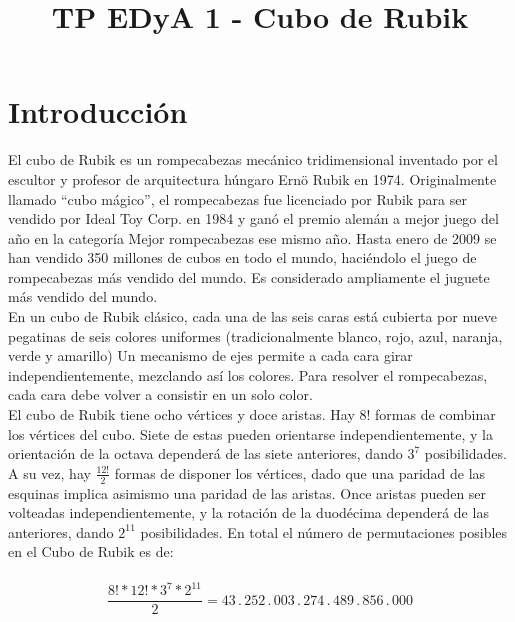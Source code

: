 \documentclass[11pt,a4paper]{article}
\begin{document}
\title{TP EDyA 1 - Cubo de Rubik}

\maketitle


\section{Introducción}

El cubo de Rubik es un rompecabezas mecánico tridimensional inventado por el escultor y profesor de arquitectura húngaro Ernö Rubik en 1974. Originalmente llamado ``cubo mágico'', el rompecabezas fue licenciado por Rubik para ser vendido por Ideal Toy Corp. en 1984 y ganó el premio alemán a mejor juego del año en la categoría Mejor rompecabezas ese mismo año. Hasta enero de 2009 se han vendido 350 millones de cubos en todo el mundo, haciéndolo el juego de rompecabezas más vendido del mundo. Es considerado ampliamente el juguete más vendido del mundo. \\

En un cubo de Rubik clásico, cada una de las seis caras está cubierta por nueve pegatinas de seis colores uniformes (tradicionalmente blanco, rojo, azul, naranja, verde y amarillo) Un mecanismo de ejes permite a cada cara girar independientemente, mezclando así los colores. Para resolver el rompecabezas, cada cara debe volver a consistir en un solo color.\\

El cubo de Rubik tiene ocho vértices y doce aristas. Hay $8!$ formas de combinar los vértices del cubo. Siete de estas pueden orientarse independientemente, y la orientación de la octava dependerá de las siete anteriores, dando  $3^7$ posibilidades. A su vez, hay $\frac{12!}{2}$ formas de disponer los vértices, dado que una paridad de las esquinas implica asimismo una paridad de las aristas. Once aristas pueden ser volteadas independientemente, y la rotación de la duodécima dependerá de las anteriores, dando $2^{11}$ posibilidades. En total el número de permutaciones posibles en el Cubo de Rubik es de:\\
\\
 $$ \frac{8!*12!*3^7*2^{11}}{2} = 43 \,.\, 252 \,.\, 003 \,.\, 274 \,.\, 489 \,.\, 856 \,.\, 000 $$ \\
 
\end{document}
